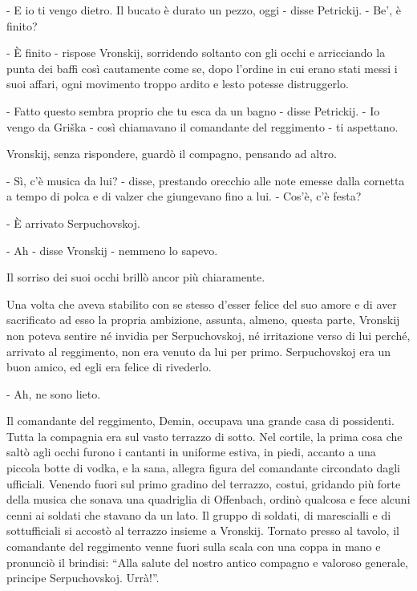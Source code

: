 \label{xxi-2} 

- E io ti vengo dietro. Il bucato è durato un pezzo, oggi - disse Petrickij. - Be', è finito? 

- È finito - rispose Vronskij, sorridendo soltanto con gli occhi e arricciando la punta dei baffi così cautamente come se, dopo l'ordine in cui erano stati messi i suoi affari, ogni movimento troppo ardito e lesto potesse distruggerlo. 

- Fatto questo sembra proprio che tu esca da un bagno - disse Petrickij. - Io vengo da Griška - così chiamavano il comandante del reggimento - ti aspettano. 

Vronskij, senza rispondere, guardò il compagno, pensando ad altro. 

- Sì, c'è musica da lui? - disse, prestando orecchio alle note emesse dalla cornetta a tempo di polca e di valzer che giungevano fino a lui. - Cos'è, c'è festa? 

- È arrivato Serpuchovskoj. 

- Ah - disse Vronskij - nemmeno lo sapevo. 

Il sorriso dei suoi occhi brillò ancor più chiaramente. 

Una volta che aveva stabilito con se stesso d'esser felice del suo amore e di aver sacrificato ad esso la propria ambizione, assunta, almeno, questa parte, Vronskij non poteva sentire né invidia per Serpuchovskoj, né irritazione verso di lui perché, arrivato al reggimento, non era venuto da lui per primo. Serpuchovskoj era un buon amico, ed egli era felice di rivederlo. 

- Ah, ne sono lieto. 

Il comandante del reggimento, Demin, occupava una grande casa di possidenti. Tutta la compagnia era sul vasto terrazzo di sotto. Nel cortile, la prima cosa che saltò agli occhi furono i cantanti in uniforme estiva, in piedi, accanto a una piccola botte di vodka, e la sana, allegra figura del comandante circondato dagli ufficiali. Venendo fuori sul primo gradino del terrazzo, costui, gridando più forte della musica che sonava una quadriglia di Offenbach, ordinò qualcosa e fece alcuni cenni ai soldati che stavano da un lato. Il gruppo di soldati, di marescialli e di sottufficiali si accostò al terrazzo insieme a Vronskij. Tornato presso al tavolo, il comandante del reggimento venne fuori sulla scala con una coppa in mano e pronunciò il brindisi: ``Alla salute del nostro antico compagno e valoroso generale, principe Serpuchovskoj. Urrà!''. 

